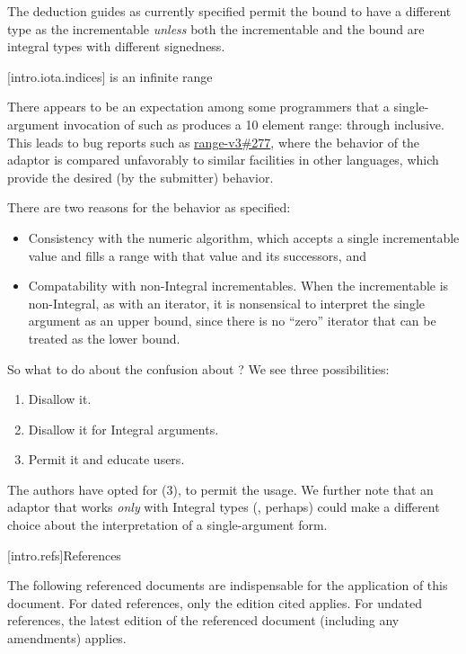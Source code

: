 \pnum
The deduction guides as currently specified permit the bound to have a different
type as the incrementable \textit{unless} both the incrementable and the bound
are integral types with different signedness.

[intro.iota.indices]{ is an infinite range}

\pnum
There appears to be an expectation among some programmers that a single-argument
invocation of  such as  produces a 10 element
range:  through  inclusive. This leads to bug reports such as
\href{https://github.com/ericniebler/range-v3/issues/277}{range-v3\#277}, where
the behavior of the  adaptor is compared unfavorably to similar
facilities in other languages, which provide the desired (by the submitter)
behavior.

\pnum
There are two reasons for the behavior as specified:

\begin{itemize}
\item Consistency with the  numeric algorithm, which accepts a
single incrementable value and fills a range with that value and its successors, and
\item Compatability with non-Integral incrementables. When the incrementable is
non-Integral, as with an iterator, it is nonsensical to interpret the single
argument as an upper bound, since there is no ``zero'' iterator that can be
treated as the lower bound.
\end{itemize}

\pnum
So what to do about the confusion about ? We see three
possibilities:

\begin{enumerate}
\item Disallow it.
\item Disallow it for Integral arguments.
\item Permit it and educate users.
\end{enumerate}

The authors have opted for (3), to permit the usage. We further note that an
adaptor that works \textit{only} with Integral types (,
perhaps) could make a different choice about the interpretation of a
single-argument form.


[intro.refs]{References}

\pnum
The following referenced documents are indispensable for the
application of this document. For dated references, only the
edition cited applies. For undated references, the latest edition
of the referenced document (including any amendments) applies.

